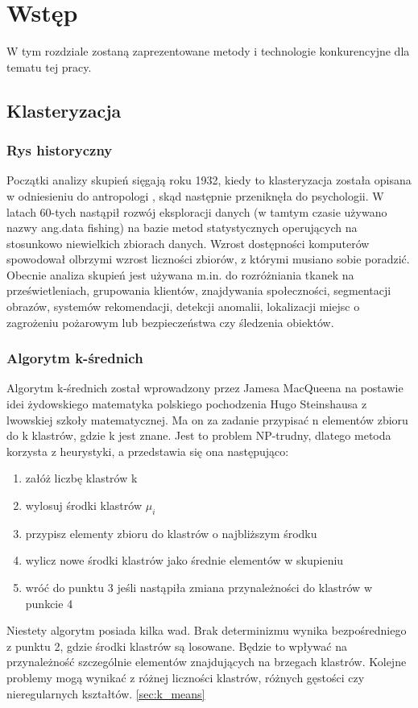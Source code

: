 \chapter{Wstęp}
\label{cha:wstep}

W tym rozdziale zostaną zaprezentowane metody i technologie konkurencyjne dla tematu tej pracy.

\section{Klasteryzacja}
\label{sec:klasteryzacja}

\subsection{Rys historyczny}
Początki analizy skupień sięgają roku 1932, kiedy to klasteryzacja została opisana w odniesieniu do antropologi \cite{Dri32}, skąd następnie przeniknęła do psychologii. W latach 60-tych nastąpił rozwój eksploracji danych (w tamtym czasie używano nazwy ang.data fishing) na bazie metod statystycznych operujących na stosunkowo niewielkich zbiorach danych. Wzrost dostępności komputerów spowodował olbrzymi wzrost liczności zbiorów, z którymi musiano sobie poradzić. Obecnie analiza skupień jest używana m.in. do rozróżniania tkanek na prześwietleniach, grupowania klientów, znajdywania społeczności, segmentacji obrazów, systemów rekomendacji, detekcji anomalii, lokalizacji miejsc o zagrożeniu pożarowym lub bezpieczeństwa czy śledzenia obiektów.

\subsection{Algorytm k-średnich}
Algorytm k-średnich został wprowadzony przez Jamesa MacQueena \cite{Mac67} na postawie idei żydowskiego matematyka polskiego pochodzenia Hugo Steinshausa z lwowskiej szkoły matematycznej.\newline
Ma on za zadanie przypisać n elementów zbioru do k klastrów, gdzie k jest znane. Jest to problem NP-trudny, dlatego metoda korzysta z heurystyki, a przedstawia się ona następująco:
\begin{enumerate}
	\item{załóż liczbę klastrów k}
	\item{wylosuj środki klastrów $\mu_i$}
	\item{przypisz elementy zbioru do klastrów o najbliższym środku}
	\item{wylicz nowe środki klastrów jako średnie elementów w skupieniu}
	\item{wróć do punktu 3 jeśli nastąpiła zmiana przynależności do klastrów w punkcie 4}
\end{enumerate}
Niestety algorytm posiada kilka wad. Brak determinizmu wynika bezpośredniego z punktu 2, gdzie środki klastrów są losowane. Będzie to wpływać na przynależność szczególnie elementów znajdujących na brzegach klastrów. Kolejne problemy mogą wynikać z różnej liczności klastrów, różnych gęstości czy nieregularnych kształtów. \ref{sec:k_means}

